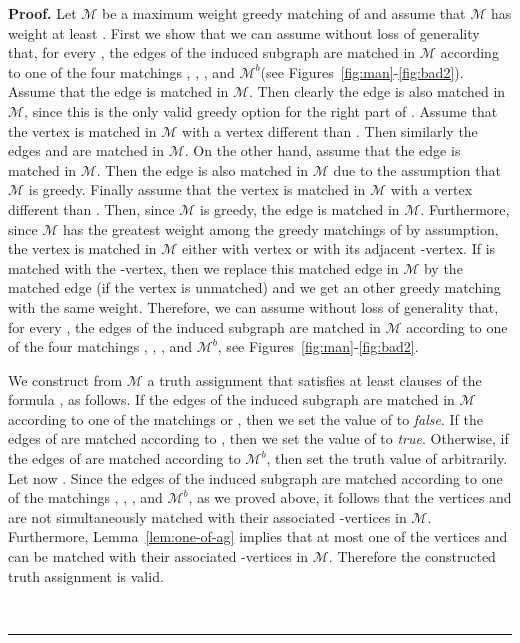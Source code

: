 \documentclass[a4paper,11pt]{article}
\newenvironment{proof}[1][Proof]{\noindent\textbf{#1.} }{\ \rule{0.5em}{0.5em}}
\newcommand{\mcal}{\ensuremath{\mathcal{M}}\xspace}
\newcommand{\mbad}{\ensuremath{\mathcal{M}^b}\xspace}
\begin{document}
\begin{proof}
Let \mcal be a maximum weight greedy matching of  and assume that \mcal has 
weight at least . 
First we show that we can assume without loss of generality that, for every 
, the edges of the induced subgraph  are matched in \mcal 
according to one of the four matchings , , , and \mbad (see Figures~\ref{fig:man}-\ref{fig:bad2}). 
Assume that the edge  is matched in \mcal. 
Then clearly the edge  is also matched in \mcal, since this is the only valid greedy option for the right part of . 
Assume that the vertex  is matched in \mcal with a vertex different 
than . Then similarly the edges  and 
 are matched in \mcal. On the other hand, assume that the 
edge  is matched in \mcal. 
Then the edge  is also matched in \mcal due to the assumption
that \mcal is greedy.
Finally assume that the vertex  is matched in \mcal with a vertex
different than . 
Then, since \mcal is greedy, the edge  is matched in \mcal. 
Furthermore, since \mcal has the greatest weight among the greedy matchings of 
 by assumption, the vertex  is matched in \mcal either with 
vertex  or with its adjacent -vertex. 
If  is matched with the -vertex, then we replace this matched 
edge in \mcal by the matched edge  (if the vertex
 is unmatched) and we get an other greedy matching with the same weight. 
Therefore, we can assume without loss of generality that, for every , 
the edges of the induced subgraph  are matched in \mcal 
according to one of the four matchings , , , and \mbad, see 
Figures~\ref{fig:man}-\ref{fig:bad2}.



We construct from \mcal a truth assignment that satisfies at least  clauses 
of the formula , as follows. 
If the edges of the induced subgraph  are matched in \mcal according to one of the matchings  or , then we set the value of  to \emph{false}. 
If the edges of  are matched according to , then we set the value of  to \emph{true}. 
Otherwise, if the edges of  are matched according to \mbad, then set the truth value of  arbitrarily. 
Let now . Since the edges of the induced subgraph  are matched according to one of the matchings , , , and \mbad, as we proved above, 
it follows that the vertices  and  are not simultaneously matched with their associated -vertices in \mcal. 
Furthermore, Lemma~\ref{lem:one-of-ag} implies that at most one of the vertices 
 and  can be matched with their associated -vertices
in \mcal. 
Therefore the constructed truth assignment is valid.





\end{proof}
\end{document}
